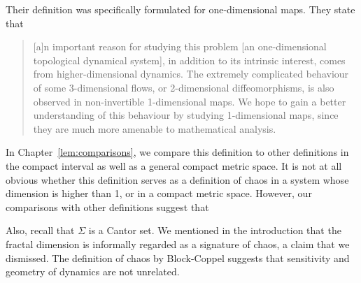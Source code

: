 \documentclass[10pt,twoside]{book}
\begin{document}
Their definition was specifically formulated for one-dimensional maps.
They state that
\begin{quotation}
  [a]n important reason for studying this problem [an one-dimensional topological dynamical system], in addition to its intrinsic interest, comes from higher-dimensional dynamics.
  The extremely complicated behaviour of some 3-dimensional flows, or 2-dimensional diffeomorphisms, is also observed in non-invertible 1-dimensional maps.
  We hope to gain a better understanding of this behaviour by studying 1-dimensional maps, since they are much more amenable to mathematical analysis.
\end{quotation}
In Chapter~\ref{lem:comparisons}, we compare this definition to other definitions in the compact interval as well as a general compact metric space.
It is not at all obvious whether this definition serves as a definition of chaos in a system whose dimension is higher than 1, or in a compact metric space.
However, our comparisons with other definitions suggest that 

Also, recall that $\Sigma$ is a Cantor set.
We mentioned in the introduction that the fractal dimension is informally regarded as a signature of chaos, a claim that we dismissed.
The definition of chaos by Block-Coppel suggests that sensitivity and geometry of dynamics are not unrelated.





\printindex
\end{document}
